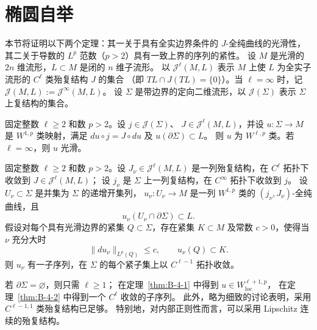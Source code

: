 
\section{椭圆自举}\label{sec:B-4}

本节将证明以下两个定理：其一关于具有全实边界条件的 $J$-全纯曲线的光滑性，
其二关于导数的 $L^p$ 范数（$p>2$）具有一致上界的序列的紧性。
设 $M$ 是光滑的 $2n$ 维流形，$L\subset M$ 是闭的 $n$ 维子流形。
以 $\mathcal J^\ell(M,L)$ 表示 $M$ 上使 $L$ 为全实子流形的 $C^\ell$ 类殆复结构 $J$ 的集合
（即 $TL\cap J(TL)=\{0\}$）。当 $\ell=\infty$ 时，记
$\mathcal J(M,L):=\mathcal J^\infty(M,L)$。
设 $\Sigma$ 是带边界的定向二维流形，以 $\mathcal J(\Sigma)$ 表示 $\Sigma$ 上复结构的集合。

\begin{theorem}\label{thm:B-4-1}
固定整数 $\ell\ge2$ 和数 $p>2$。设 $j\in\mathcal J(\Sigma)$、
$J\in\mathcal J^\ell(M,L)$，并设 $u:\Sigma\to M$ 是 $W^{1,p}$ 类映射，满足
$du\circ j=J\circ du$ 及 $u(\partial\Sigma)\subset L$。
则 $u$ 为 $W^{\ell,p}$ 类。若 $\ell=\infty$，则 $u$ 光滑。
\end{theorem}

\begin{theorem}[\BookRecordIndex{T0192}紧性]\label{thm:B-4-2}
固定整数 $\ell\ge2$ 和数 $p>2$。设 $J_\nu\in\mathcal J^\ell(M,L)$
是一列殆复结构，在 $C^\ell$ 拓扑下收敛到 $J\in\mathcal J^\ell(M,L)$；
设 $j_\nu$ 是 $\Sigma$ 上一列复结构，在 $C^\infty$ 拓扑下收敛到 $j$。
设 $U_\nu\subset\Sigma$ 是并集为 $\Sigma$ 的递增开集列，
$u_\nu:U_\nu\to M$ 是一列 $W^{1,p}$ 类的 $(j_\nu,J_\nu)$-全纯曲线，且
\[
  u_\nu(U_\nu\cap\partial\Sigma)\subset L.
\]
假设对每个具有光滑边界的紧集 $Q\subset\Sigma$，存在紧集 $K\subset M$
及常数 $c>0$，使得当 $\nu$ 充分大时
\[
  \|du_\nu\|_{L^p(Q)}\le c,\qquad u_\nu(Q)\subset K.
\]
则 $u_\nu$ 有一子序列，在 $\Sigma$ 的每个紧子集上以 $C^{\ell-1}$ 拓扑收敛。
\end{theorem}

\begin{remark}\label{rem:B-4-3}
若 $\partial\Sigma=\varnothing$，则只需 $\ell\ge1$；
在定理~\ref{thm:B-4-1} 中得到 $u\in W^{\ell+1,p}_{\mathrm{loc}}$，
在定理~\ref{thm:B-4-2} 中得到一个 $C^\ell$ 收敛的子序列。
此外，略为细致的讨论表明，采用 $C^{\ell-1,1}$ 类殆复结构已足够。
特别地，对内部正则性而言，可以采用 Lipschitz 连续的殆复结构。
\end{remark}

